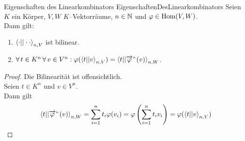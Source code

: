\begin{lemma}{Eigenschaften des Linearkombinators}
             {EigenschaftenDesLinearkombinators}
Seien $K$ ein Körper, $V,W$ $K$--Vektorräume, $n\in\mathbb{N}$ und $\varphi\in\mathop{\textrm{Hom}}\nolimits(V,W)$.\\
Dann gilt:
\begin{enumerate}[(1)]
\item\label{EigenschaftenDesLinearkombinators1} 
$\left\langle \cdot ||\cdot\cdot\right\rangle_{n, V}$ ist bilinear.
\item\label{EigenschaftenDesLinearkombinators2}
 $\forall\, t \in K^n\,\forall\, v \in V^n:
    \varphi(\left\langle t ||v\right\rangle_{n, V}) = \left\langle t ||{\overrightarrow{\varphi}}^{{}_n} (v)\right\rangle_{n, W}$.
\end{enumerate}
\end{lemma}
\begin{proof}
Die Bilinearität ist offensichtlich.\\
Seien $t \in K^n$ und $v \in V^n$.\\
Dann gilt \[
\left\langle t ||{\overrightarrow{\varphi}}^{{}_n} (v)\right\rangle _{n, W} = \sum_{i=1}^n t_i \varphi(v_i)
                       = \varphi\left(\sum_{i=1}^n t_i v_i\right)
                       = \varphi(\left\langle t ||v\right\rangle_{n, V}) \qedhere
\]
\end{proof}